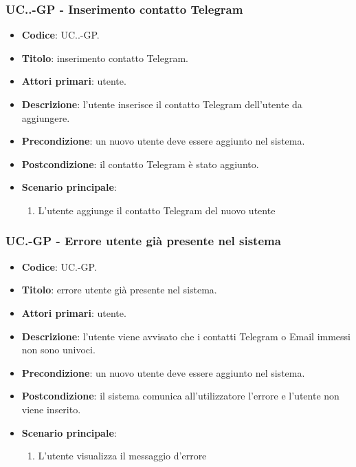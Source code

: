 		\subsubsection{UC\theuccount.\thesubuccount.\thesubsubuccount-GP - Inserimento contatto Telegram}

			\begin{itemize}
				\item \textbf{Codice}: UC\theuccount.\thesubuccount.\thesubsubuccount-GP.
				\item \textbf{Titolo}: inserimento contatto Telegram.
				\item \textbf{Attori primari}: utente.
				\item \textbf{Descrizione}: l'utente inserisce il contatto Telegram dell'utente da aggiungere.
				\item \textbf{Precondizione}: un nuovo utente deve essere aggiunto nel sistema.
				\item \textbf{Postcondizione}: il contatto Telegram è stato aggiunto.
				\item \textbf{Scenario principale}:
				\begin{enumerate}
					\item L'utente aggiunge il contatto Telegram del nuovo utente
				\end{enumerate}
			\end{itemize}

	\subsubsection{UC\theuccount.\thesubuccount-GP - Errore utente già presente nel sistema}

		\begin{itemize}
			\item \textbf{Codice}: UC\theuccount.\thesubuccount-GP.
			\item \textbf{Titolo}: errore utente già presente nel sistema.
			\item \textbf{Attori primari}: utente.
			\item \textbf{Descrizione}: l’utente viene avvisato che i contatti Telegram o Email immessi non sono univoci.
			\item \textbf{Precondizione}: un nuovo utente deve essere aggiunto nel sistema.
			\item \textbf{Postcondizione}: il sistema comunica all’utilizzatore l’errore e l'utente non viene inserito.
			\item \textbf{Scenario principale}:
			\begin{enumerate}
				\item L'utente visualizza il messaggio d'errore
			\end{enumerate}
			\end{itemize}